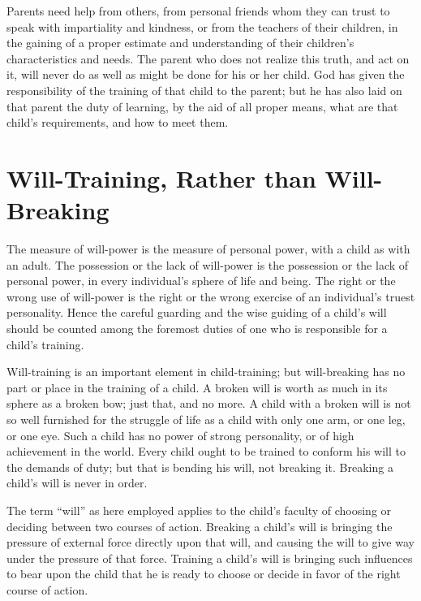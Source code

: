 \documentclass[
]{book}
\begin{document}
Parents need help from others, from personal friends whom they can trust to speak with impartiality and kindness, or from the teachers of their children, in the gaining of a proper estimate and understanding of their children's characteristics and needs. The parent who does not realize this truth, and act on it, will never do as well as might be done for his or her child. God has given the responsibility of the training of that child to the parent; but he has also laid on that parent the duty of learning, by the aid of all proper means, what are that child's requirements, and how to meet them.

\hypertarget{will-training-rather-than-will-breaking}{%
\chapter{Will-Training, Rather than Will-Breaking}\label{will-training-rather-than-will-breaking}}

The measure of will-power is the measure of personal power, with a child as with an adult. The possession or the lack of will-power is the possession or the lack of personal power, in every individual's sphere of life and being. The right or the wrong use of will-power is the right or the wrong exercise of an individual's truest personality. Hence the careful guarding and the wise guiding of a child's will should be counted among the foremost duties of one who is responsible for a child's training.

Will-training is an important element in child-training; but will-breaking has no part or place in the training of a child. A broken will is worth as much in its sphere as a broken bow; just that, and no more. A child with a broken will is not so well furnished for the struggle of life as a child with only one arm, or one leg, or one eye. Such a child has no power of strong personality, or of high achievement in the world. Every child ought to be trained to conform his will to the demands of duty; but that is bending his will, not breaking it. Breaking a child's will is never in order.

The term ``will'' as here employed applies to the child's faculty of choosing or deciding between two courses of action. Breaking a child's will is bringing the pressure of external force directly upon that will, and causing the will to give way under the pressure of that force. Training a child's will is bringing such influences to bear upon the child that he is ready to choose or decide in favor of the right course of action.
\end{document}
